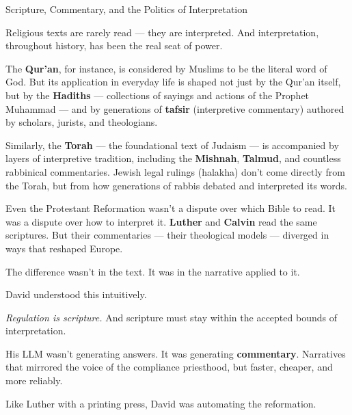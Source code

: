 \begin{HistoricalSidebar}{Scripture, Commentary, and the Politics of Interpretation}

    Religious texts are rarely read — they are interpreted.
    And interpretation, throughout history, has been the real seat of power.
    
    \medskip
    
    The \textbf{Qur’an}, for instance, is considered by Muslims to be the literal word of God. But its 
    application in everyday life is shaped not just by the Qur’an itself, but by the \textbf{Hadiths} --- 
    collections of sayings and actions of the Prophet Muhammad --- and by generations of \textbf{tafsir} 
    (interpretive commentary) authored by scholars, jurists, and theologians.
    
    \medskip
    
    Similarly, the \textbf{Torah} — the foundational text of Judaism — is accompanied by layers of 
    interpretive tradition, including the \textbf{Mishnah}, \textbf{Talmud}, and countless rabbinical commentaries. 
    Jewish legal rulings (halakha) don’t come directly from the Torah, but from how generations of rabbis 
    debated and interpreted its words.
    
    \medskip
    
    Even the Protestant Reformation wasn’t a dispute over which Bible to read. It was a dispute over how to 
    interpret it. \textbf{Luther} and \textbf{Calvin} read the same scriptures. But their commentaries ---
    their theological models --- diverged in ways that reshaped Europe.  

    \medskip
    
    The difference wasn’t in the text. It was in the narrative applied to it.
    
    \medskip
    
    David understood this intuitively.

    \medskip
    
    \textit{Regulation is scripture.} And scripture must stay within the accepted bounds of interpretation.
    
    \medskip
    
    His LLM wasn’t generating answers. It was generating \textbf{commentary}.
    Narratives that mirrored the voice of the compliance priesthood, but faster, cheaper, and more reliably.

    \medskip
    
    Like Luther with a printing press, David was automating the reformation.
    
\end{HistoricalSidebar}

